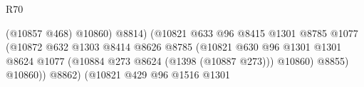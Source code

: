 \begin{lexlean}{R70}
\begin{coremodule}
                                                                    (@10857 @468)
                                                                    @10860)
                                                                  @8814)
                                                                (@10821
                                                                  @633
                                                                  @96
                                                                  @8415
                                                                  @1301
                                                                  @8785
                                                                  @1077
                                                                  (@10872
                                                                    @632
                                                                    @1303
                                                                    @8414
                                                                    @8626
                                                                    @8785
                                                                    (@10821
                                                                      @630
                                                                      @96
                                                                      @1301
                                                                      @1301
                                                                      @8624
                                                                      @1077
                                                                      (@10884
                                                                        @273
                                                                        @8624
                                                                        (@1398 (@10887 @273)))
                                                                      @10860)
                                                                    @8855)
                                                                  @10860))
                                                              @8862)
                                                            (@10821
                                                              @429
                                                              @96
                                                              @1516
                                                              @1301

\end{coremodule}
\end{lexlean}
